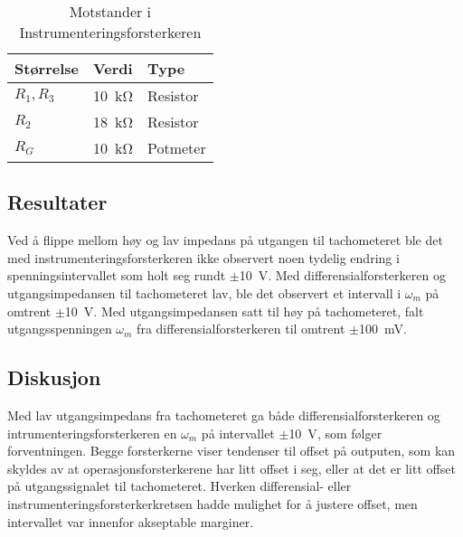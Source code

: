 \begin{table}[h]
	\centering
    \caption{Motstander i Instrumenteringsforsterkeren}
	\begin{tabular}{lll}
		\toprule
		Størrelse & Verdi & Type \\
		\midrule
        $R_1, R_3$ & \SI{10}{\kilo\ohm} & Resistor \\
        $R_2$ & \SI{18}{\kilo\ohm} & Resistor\\
        $R_G$ & \SI{10}{\kilo\ohm} & Potmeter\\
		\bottomrule
	\end{tabular}
    \label{tab:Instrumenteringsforsterker}
\end{table}







\subsection{Resultater}

Ved å flippe mellom høy og lav impedans på utgangen til tachometeret ble det med instrumenteringsforsterkeren ikke observert noen tydelig endring i spenningsintervallet som holt seg rundt $\pm${\SI{10}{\volt}}. Med differensialforsterkeren og utgangsimpedansen til tachometeret lav, ble det observert et intervall i $\omega_m$ på omtrent $\pm${\SI{10}{\volt}}. Med utgangsimpedansen satt til høy på tachometeret, falt utgangsspenningen $\omega_m$ fra differensialforsterkeren til omtrent $\pm${\SI{100}{\milli\volt}}.






\subsection{Diskusjon}

Med lav utgangsimpedans fra tachometeret ga både differensialforsterkeren og intrumenteringsforsterkeren en $\omega_m$ på intervallet $\pm${\SI{10}{\volt}}, som følger forventningen. Begge forsterkerne viser tendenser til offset på outputen, som kan skyldes av at operasjonsforsterkerene har litt offset i seg, eller at det er litt offset på utgangssignalet til tachometeret. 
Hverken differensial- eller instrumenteringsforsterkerkretsen hadde mulighet for å justere offset, men intervallet var innenfor akseptable marginer.


